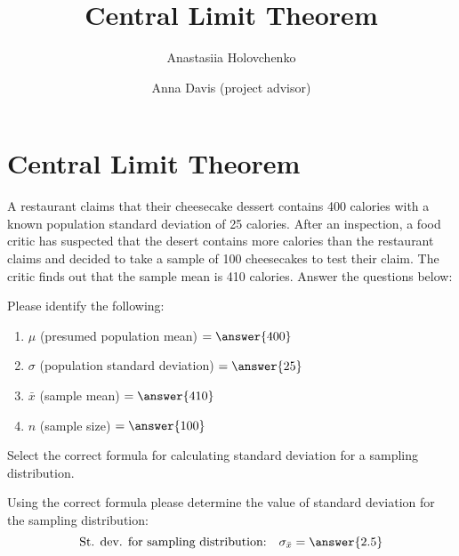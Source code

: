 \documentclass{ximera}
\author{Anastasiia Holovchenko \and Anna Davis (project advisor)} \title{Central Limit Theorem}
\begin{document}
\begin{abstract}
\end{abstract}
\maketitle

\section{Central Limit Theorem}
\begin{problem}\label{pr:cheesecake}
A restaurant claims that their cheesecake dessert contains 400 calories with a known population standard deviation of 25 calories. After an inspection, a food critic has suspected that the desert contains more calories than the restaurant claims and decided to take a sample of 100 cheesecakes to test their claim. The critic finds out that the sample mean is 410 calories. Answer the questions below:

\begin{question} 
Please identify the following:
\begin{enumerate}
    \item $\mu$ (presumed population mean) $= \answer{400}$
    \item $\sigma$ (population standard deviation) $= \answer{25}$
    \item $\bar{x}$ (sample mean) $=\answer{410}$
    \item $n$ (sample size) $= \answer{100}$
\end{enumerate}
\end{question}

\begin{question} Select the correct formula for calculating standard deviation for a sampling distribution.

\begin{multipleChoice}  
\end{multipleChoice} 

\end{question}

\begin{question} Using the correct formula please determine the value of standard deviation for the sampling distribution:
$$\mbox{St. dev. for sampling distribution:}\quad\sigma_{\bar{x}}= \answer{2.5}$$
\end{question}


\end{problem}
\end{document}
